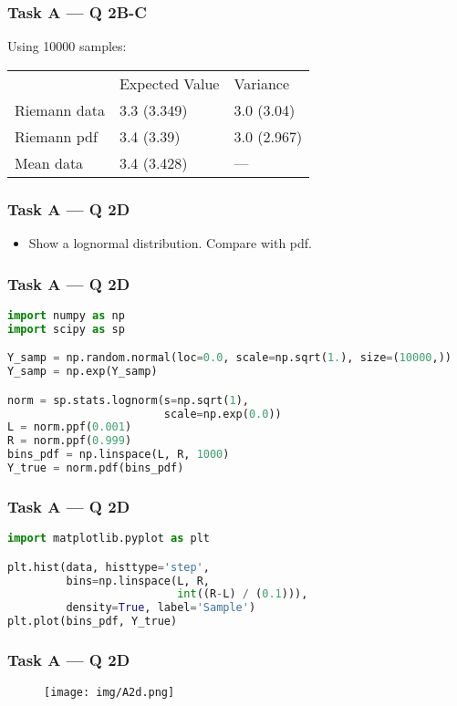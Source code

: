 \documentclass[usenames,dvipsnames]{beamer}
\begin{document}
\begin{frame}
\frametitle{Task A --- Q 2B-C}
Using 10000 samples:
\begin{table}
\centering
\begin{tabular}{lll}
             & Expected Value & Variance \\
Riemann data & 3.3 (3.349)    & 3.0 (3.04) \\
Riemann pdf  & 3.4 (3.39)     & 3.0 (2.967) \\
Mean data    & 3.4 (3.428)    & --- \\
\end{tabular}
\end{table}
\end{frame}



\begin{frame}
\frametitle{Task A --- Q 2D}
\begin{itemize}
\item Show a lognormal distribution. Compare with pdf.
\end{itemize}
\end{frame}

\begin{frame}[fragile]
\frametitle{Task A --- Q 2D}
\begin{lstlisting}[language=Python]
import numpy as np
import scipy as sp

Y_samp = np.random.normal(loc=0.0, scale=np.sqrt(1.), size=(10000,))
Y_samp = np.exp(Y_samp)

norm = sp.stats.lognorm(s=np.sqrt(1),
                        scale=np.exp(0.0))
L = norm.ppf(0.001)
R = norm.ppf(0.999)
bins_pdf = np.linspace(L, R, 1000)
Y_true = norm.pdf(bins_pdf)
\end{lstlisting}
\end{frame}

\begin{frame}[fragile]
\frametitle{Task A --- Q 2D}
\begin{lstlisting}[language=Python]
import matplotlib.pyplot as plt

plt.hist(data, histtype='step',
         bins=np.linspace(L, R,
                          int((R-L) / (0.1))),
         density=True, label='Sample')
plt.plot(bins_pdf, Y_true)
\end{lstlisting}
\end{frame}

\begin{frame}[fragile]
\frametitle{Task A --- Q 2D}
\begin{figure}
\centering
\texttt{[image: img/A2d.png]}
\end{figure}
\end{frame}
\end{document}
